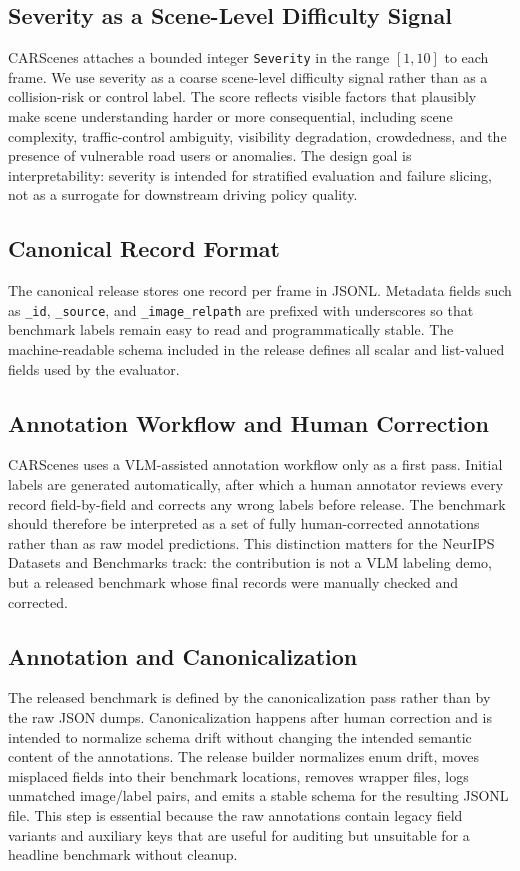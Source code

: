 \subsection{Severity as a Scene-Level Difficulty Signal}
CARScenes attaches a bounded integer \texttt{Severity} in the range \([1,10]\) to each frame. We use severity as a coarse scene-level difficulty signal rather than as a collision-risk or control label. The score reflects visible factors that plausibly make scene understanding harder or more consequential, including scene complexity, traffic-control ambiguity, visibility degradation, crowdedness, and the presence of vulnerable road users or anomalies. The design goal is interpretability: severity is intended for stratified evaluation and failure slicing, not as a surrogate for downstream driving policy quality.

\subsection{Canonical Record Format}
The canonical release stores one record per frame in JSONL. Metadata fields such as \texttt{\_id}, \texttt{\_source}, and \texttt{\_image\_relpath} are prefixed with underscores so that benchmark labels remain easy to read and programmatically stable. The machine-readable schema included in the release defines all scalar and list-valued fields used by the evaluator.

\subsection{Annotation Workflow and Human Correction}
CARScenes uses a VLM-assisted annotation workflow only as a first pass. Initial labels are generated automatically, after which a human annotator reviews every record field-by-field and corrects any wrong labels before release. The benchmark should therefore be interpreted as a set of fully human-corrected annotations rather than as raw model predictions. This distinction matters for the NeurIPS Datasets and Benchmarks track: the contribution is not a VLM labeling demo, but a released benchmark whose final records were manually checked and corrected.

\subsection{Annotation and Canonicalization}
The released benchmark is defined by the canonicalization pass rather than by the raw JSON dumps. Canonicalization happens after human correction and is intended to normalize schema drift without changing the intended semantic content of the annotations. The release builder normalizes enum drift, moves misplaced fields into their benchmark locations, removes wrapper files, logs unmatched image/label pairs, and emits a stable schema for the resulting JSONL file. This step is essential because the raw annotations contain legacy field variants and auxiliary keys that are useful for auditing but unsuitable for a headline benchmark without cleanup.
